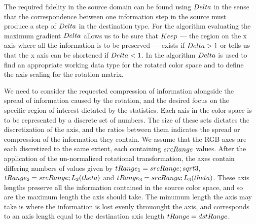 The required fidelity in the source domain can be found using $ \\Delta$ in the sense that the correspondence between one information step in the source must produce a step of $\\Delta$ in the destination type. For the algorithm evaluating the maximum gradient $\\Delta$ allows us to be sure that  $\\Keep$ --- the region on the x axis where all the information is to be preserved --- exists if $\\Delta >1$ or tells us that the x axis can be shortened if  $\\Delta < 1$. In the algorithm $\\Delta$ is used to find an appropriate working data type for the rotated color space and to define the axis scaling for the rotation matrix.


We need to consider the requested compression of information alongside the spread of information caused by the rotation, and the desired focus on the specific region of interest dictated by the statistics. Each axis in the color space is to be represented by a discrete set of numbers. The size of these sets dictates the discretization of the axis, and the ratios between them indicates the spread or compression of the information they contain. We assume that the RGB axes are each discretized to the same extent, each containing $\\srcRange$ values. After the application of the un-normalized rotational transformation, the axes contain differing numbers of values given by $\\tRange_1 =\\srcRange \\; \\sqrt{3} $, $\\tRange_2 = \\srcRange \\; L_2(\\theta) $  and $\\tRange_3 = \\srcRange \\; L_3(\\theta)$. These axis lengths preserve all the information contained in the source color space, and so are the maximum length the axis should take. The minumum length the axis may take is where the information is lost evenly throuought the axis, and corresponds to an axis length equal to the destination axis length $\\tRange = \\dstRange$. 

